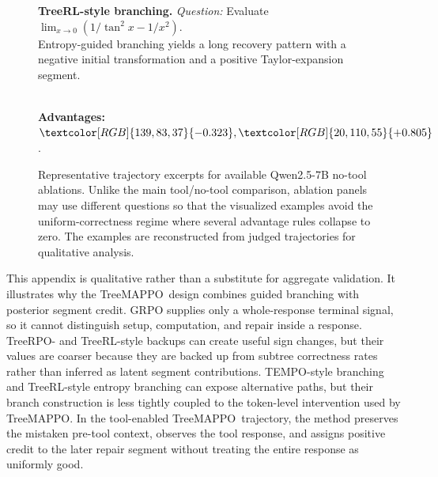 \documentclass{article}
\newcommand{\ours}{TreeMAPPO\xspace}
\begin{document}
\begin{figure}[t]
{\begin{minipage}{0.95\textwidth}
\textbf{TreeRL-style branching.} \emph{Question:} Evaluate \( \lim_{x\to0}\left(1/\tan^2x-1/x^2\right) \).\\
Entropy-guided branching yields a long recovery pattern with a negative initial transformation and a positive Taylor-expansion segment.\\
\begingroup\ttfamily\scriptsize\raggedright\sloppy
\textcolor[RGB]{139,83,37}{}
\textcolor[RGB]{20,110,55}{}
\endgroup\\[-2pt]
\textbf{Advantages:} $\textcolor[RGB]{139,83,37}{-0.323},\textcolor[RGB]{20,110,55}{+0.805}$.
\end{minipage}}
\caption{Representative trajectory excerpts for available Qwen2.5-7B no-tool ablations. Unlike the main tool/no-tool comparison, ablation panels may use different questions so that the visualized examples avoid the uniform-correctness regime where several advantage rules collapse to zero. The examples are reconstructed from judged trajectories for qualitative analysis.}
\label{fig:case-study-ablation-trajectories}
\end{figure}

This appendix is qualitative rather than a substitute for aggregate validation. It illustrates why the \ours\ design combines guided branching with posterior segment credit. GRPO supplies only a whole-response terminal signal, so it cannot distinguish setup, computation, and repair inside a response. TreeRPO- and TreeRL-style backups can create useful sign changes, but their values are coarser because they are backed up from subtree correctness rates rather than inferred as latent segment contributions. TEMPO-style branching and TreeRL-style entropy branching can expose alternative paths, but their branch construction is less tightly coupled to the token-level intervention used by \ours. In the tool-enabled \ours\ trajectory, the method preserves the mistaken pre-tool context, observes the tool response, and assigns positive credit to the later repair segment without treating the entire response as uniformly good.
\end{document}
